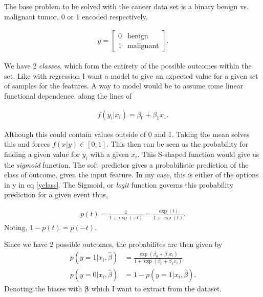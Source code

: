 \documentclass[10pt]{article}
\begin{document}

The base problem to be solved with the cancer data set is a binary benign vs.
malignant tumor, 0 or 1 encoded respectively, 

\begin{align}
y = 
	\begin{bmatrix}
		0 & \text{benign} \\
		1 & \text{malignant}
	\end{bmatrix}.
	\label{yclass}
\end{align}

We have 2 \emph{classes}, which form the entirety of the possible outcomes within
the set. Like with regression I want a model to give an expected value for a given 
set of samples for the features. A way to model would be to assume some linear functional
dependence, along the lines of

\begin{align*}
	f(y_i|x_i) = \beta_0 + \beta_1 x_1.
\end{align*}

Although this could contain values outside of 0 and 1. Taking the mean solves
this and forces $f(x|y) \in [0, 1]$. This then can be seen as the probability
for finding a given value for $y_i$ with a given $x_i$. This S-shaped function
would give us the \emph{sigmoid} function. 	
The soft predictor gives a probabilistic prediction of the class of outcome,
given the input feature. In my case, this is either of the options in
y in eq \ref{yclass}.  The Sigmoid, or \emph{logit} function governs this
probability prediction for a given event thus,

\begin{align}
	p(t) = \frac{1}{1 + \exp(-t)} = \frac{\exp(t)}{1+\exp(t)}
	\label{logit}.
\end{align}
Noting, $1 - p(t) = p(-t)$.

Since we have 2 possible outcomes, the probabilites are then given by
\begin{align}
	p(y=1|x_i, \hat{\beta}) &= \frac{ \exp(\beta_0 + \beta_1x_i) }
								{ 1 + \exp(\beta_0 + \beta_1x_i) } 
								\label{prob1}\\
	p(y=0|x_i, \hat{\beta}) &= 1 - p(y=1|x_i, \hat{\beta})\label{prob0}.
\end{align}
Denoting the biases with $\mathbf{\beta}$ which I want to extract from the dataset. 
\end{document}
